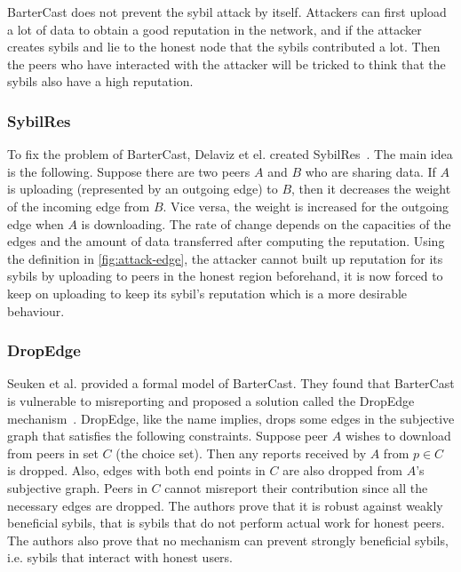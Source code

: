 BarterCast does not prevent the sybil attack by itself. Attackers can first
upload a lot of data to obtain a good reputation in the network, and if the
attacker creates sybils and lie to the honest node that the sybils contributed a
lot. Then the peers who have interacted with the attacker will be tricked to
think that the sybils also have a high reputation.

\subsubsection{SybilRes}

To fix the problem of BarterCast, Delaviz et el. created
SybilRes~\cite{delaviz2012sybilres}.
The main idea is the following. Suppose there are two peers $A$ and $B$ who are
sharing data. If $A$ is uploading (represented by an outgoing edge) to $B$, then
it decreases the weight of the incoming edge from $B$. Vice versa, the weight is
increased for the outgoing edge when $A$ is downloading. The rate of change
depends on the capacities of the edges and the amount of data transferred after
computing the reputation. Using the definition in \autoref{fig:attack-edge}, the
attacker cannot built up reputation for its sybils by uploading to peers in the
honest region beforehand, it is now forced to keep on uploading to keep its
sybil's reputation which is a more desirable behaviour.

\subsubsection{DropEdge}
Seuken et al. provided a formal model of BarterCast. They found that BarterCast
is vulnerable to misreporting and proposed a solution called the DropEdge
mechanism~\cite{seuken2011sybil, seuken2014sybil}. DropEdge, like the name
implies, drops some edges in the subjective graph that satisfies the following
constraints. Suppose peer $A$ wishes to download from peers in set $C$ (the
choice set). Then any reports received by $A$ from $p \in C$ is dropped. Also,
edges with both end points in $C$ are also dropped from $A$'s subjective graph.
Peers in $C$ cannot misreport their contribution since all the necessary edges
are dropped. The authors prove that it is robust against weakly beneficial
sybils, that is sybils that do not perform actual work for honest peers. The
authors also prove that no mechanism can prevent strongly beneficial sybils,
i.e. sybils that interact with honest users.

